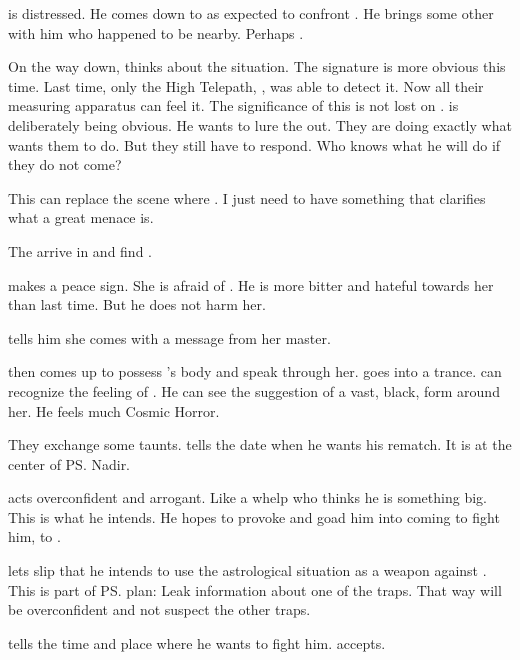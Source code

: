 \Teshrial is distressed. 
He comes down to \Forclin as expected to confront \Criseis. 
He brings some other \resphain with him who happened to be nearby. 
Perhaps \Menessiaraid. 

On the way down, \Teshrial thinks about the situation.
The \vertex signature is more obvious this time. 
Last time, only the High Telepath, \Achsah, was able to detect it. 
Now all their measuring apparatus can feel it.
The significance of this is not lost on \Teshrial. 
\Ishnaruchaefir is deliberately being obvious.
He wants to lure the \resphain out. 
They are doing exactly what \Ishnaruchaefir wants them to do. 
But they still have to respond.
Who knows what he will do if they do not come?

This can replace the scene where . 
I just need to have something that clarifies what a great menace \Ishnaruchaefir is. 

The \resphain arrive in \Malcur and find \Criseis. 

\Criseis makes a peace sign.
She is afraid of \Teshrial.
He is more bitter and hateful towards her than last time. 
But he does not harm her. 

\Criseis tells him she comes with a message from her master.

\Ishnaruchaefir then comes up to possess \Criseis's body and speak through her.
\Criseis goes into a trance. 
\Teshrial can recognize the feeling of \Ishnaruchaefir.
He can see the suggestion of a vast, black, \draconian form around her. 
He feels much Cosmic Horror. 

They exchange some taunts. 
\Teshrial{} tells \Ishnaruchaefir{} the date when he wants his rematch. 
It is at the center of \ps{\Ishnaruchaefir} Nadir. 

\Teshrial{} acts overconfident and arrogant. 
Like a whelp who thinks he is something big. 
This is what he intends. 
He hopes to provoke \Ishnaruchaefir{} and goad him into coming to fight him, to . 

\Teshrial lets slip that he intends to use the astrological situation as a weapon against \Ishnaruchaefir. 
This is part of \ps{\Teshrial} plan: 
Leak information about one of the traps. 
That way \Ishnaruchaefir{} will be overconfident and not suspect the other traps. 

\Teshrial tells \Ishnaruchaefir the time and place where he wants to fight him.
\Ishnaruchaefir accepts. 

